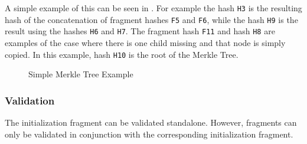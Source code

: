 A simple example of this can be seen in . For example the hash \texttt{H3} is the resulting hash of the concatenation of fragment hashes \texttt{F5} and \texttt{F6}, while the hash \texttt{H9} is the result using the hashes \texttt{H6} and \texttt{H7}. The fragment hash \texttt{F11} and hash \texttt{H8} are examples of the case where there is one child missing and that node is simply copied. In this example, hash \texttt{H10} is the root of the Merkle Tree.

\begin{figure}
    \centering
    \caption{Simple Merkle Tree Example}
    \label{fig:merkle_example}
\end{figure}

\subsubsection{Validation}

The initialization fragment can be validated standalone. However, fragments can only be validated in conjunction with the corresponding initialization fragment.

